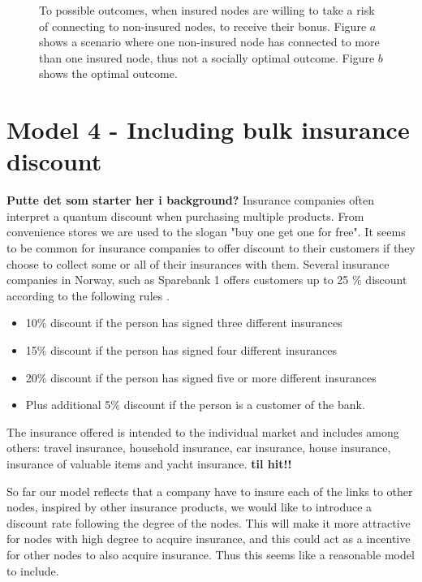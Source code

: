 \begin{figure}[t]
  \caption{\label{fig:bonusviolating} To possible outcomes, when insured nodes are willing to take a risk of connecting to non-insured nodes, to receive their bonus. Figure $a$ shows a scenario where one non-insured node has connected to more than one insured node, thus not a socially optimal outcome. Figure $b$ shows the optimal outcome. }
\end{figure}


\section{Model 4 - Including bulk insurance discount}
\textbf{Putte det som starter her i background?}
Insurance companies often interpret a quantum discount when purchasing multiple products. From convenience stores we are used to the slogan "buy one get one for free". It seems to be common for insurance companies to offer discount to their customers if they choose to collect some or all of their insurances with them. Several insurance companies in Norway, such as Sparebank 1 offers customers up to 25 $\%$ discount according to the following rules \cite{sparebank1}. 

\begin{itemize}

\item 10$\%$ discount if the person has signed three different insurances
\item 15$\%$ discount if the person has signed four different insurances
\item 20$\%$ discount if the person has signed five or more different insurances
\item Plus additional 5$\%$ discount if the person is a customer of the bank. 

\end{itemize}

The insurance offered is intended to the individual market and includes among others: travel insurance, household insurance, car insurance, house insurance, insurance of valuable items and yacht insurance.
\textbf{til hit!!}

So far our model reflects that a company have to insure each of the links to other nodes, inspired by other insurance products, we would like to introduce a discount rate following the degree of the nodes. This will make it more attractive for nodes with high degree to acquire insurance, and this could act as a incentive for other nodes to also acquire insurance. Thus this seems like a reasonable model to include.  

